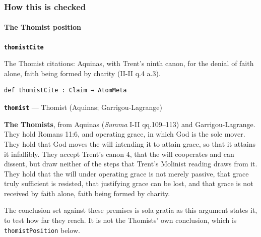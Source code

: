 \documentclass[11pt]{article}
\begin{document}
\subsubsection*{How this is checked}
\paragraph*{The Thomist position}
\leavevmode\par\nobreak
\par\medskip\noindent\textbf{\texttt{thomist\allowbreak{}Cite}}\par\nobreak\noindent
The Thomist citations: Aquinas, with Trent’s ninth canon, for the denial of faith alone, faith being formed by charity (II-II q.4 a.3).

{\small\begin{verbatim}
def thomistCite : Claim → AtomMeta
\end{verbatim}}
\par\medskip\noindent\textbf{\texttt{thomist}} --- Thomist (Aquinas; Garrigou-Lagrange)\par\nobreak\noindent
\textbf{The Thomists}, from Aquinas (\emph{Summa} I-II qq.109–113) and Garrigou-Lagrange. They hold Romans 11:6, and operating grace, in which God is the sole mover. They hold that God moves the will intending it to attain grace, so that it attains it infallibly. They accept Trent’s canon 4, that the will cooperates and can dissent, but draw neither of the steps that Trent’s Molinist reading draws from it. They hold that the will under operating grace is not merely passive, that grace truly sufficient is resisted, that justifying grace can be lost, and that grace is not received by faith alone, faith being formed by charity.

The conclusion set against these premises is sola gratia as this argument states it, to test how far they reach. It is not the Thomists’ own conclusion, which is \texttt{thomist\allowbreak{}Position} below.
\end{document}

